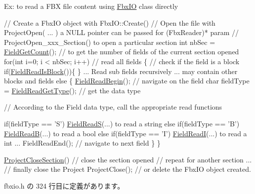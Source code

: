 Ex\+: to read a F\+BX file content using \hyperlink{class_fbx_i_o}{Fbx\+IO} class directly 
\begin{DoxyCode}
\textcolor{comment}{// Create a FbxIO object with FbxIO::Create()}
\textcolor{comment}{// Open the file with ProjectOpen( ... ) a NULL pointer can be passed for (FbxReader)* param}
\textcolor{comment}{// ProjectOpen\_xxx\_Section() to open a particular section}
\textcolor{keywordtype}{int} nbSec = \hyperlink{class_fbx_i_o_a03e5080780554283a6ffedb11b8c352a}{FieldGetCount}(); \textcolor{comment}{// to get the number of fields of the current section opened}
\textcolor{keywordflow}{for}(\textcolor{keywordtype}{int} i=0; i < nbSec; i++) \textcolor{comment}{// read all fields}
\{
    \textcolor{comment}{// check if the field is a block}
    \textcolor{keywordflow}{if}(\hyperlink{class_fbx_i_o_ac9c7d089db2f954f947e5b97a23e6f89}{FieldReadIsBlock}())\{ \} ... Read sub fields recursively ... may contain other blocks 
      and fields
    \textcolor{keywordflow}{else}
    \{
        \hyperlink{class_fbx_i_o_a0e7e1a7e91b4f5ae33e4bcf93cf315cf}{FieldReadBegin}();   \textcolor{comment}{// navigate on the field}
        \textcolor{keywordtype}{char} fieldType = \hyperlink{class_fbx_i_o_af4678c1d469f444fe96bead9668f4083}{FieldReadGetType}(); \textcolor{comment}{// get the data type}

        \textcolor{comment}{// According to the Field data type, call the appropriate read functions}

             \textcolor{keywordflow}{if}(fieldType == \textcolor{charliteral}{'S'}) \hyperlink{class_fbx_i_o_af6d036e6ffdf7d66d16f6ff0ae5768f9}{FieldReadS}(...) to read a \textcolor{keywordtype}{string}
        else if(fieldType == 'B') \hyperlink{class_fbx_i_o_a1007e4bf089c93e7f49988fa7087a202}{FieldReadB}(...) to read a \textcolor{keywordtype}{bool}
        else if(fieldType == 'I') \hyperlink{class_fbx_i_o_a6fd89404042ffd3eea33c7295f6717c2}{FieldReadI}(...) to read a \textcolor{keywordtype}{int}
        ... 
        FieldReadEnd(); \textcolor{comment}{// navigate to next field}
    \}
\}

\hyperlink{class_fbx_i_o_a6efa56aa583fc29ddcb2dbffe278bcc2}{ProjectCloseSection}() \textcolor{comment}{// close the section opened}
\textcolor{comment}{// repeat for another section ...}
\textcolor{comment}{// finally close the Project}
ProjectClose(); \textcolor{comment}{// or delete the FbxIO object created.}
\end{DoxyCode}
 

 fbxio.\+h の 324 行目に定義があります。



